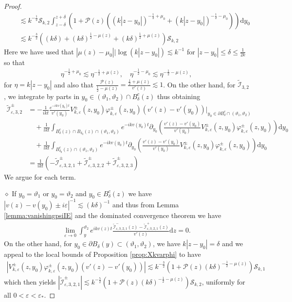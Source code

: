 \documentclass[11pt,reqno]{amsproc}
\newcommand{\diampar}[1]{\vspace{.5em}\noindent $\diamond$ \normalfont {\itshape #1.}}
\theoremstyle{definition}
\numberwithin{equation}{section}
\newcommand{\cI}{{\mathcal I}}
\newcommand{\cS}{{\mathcal S}}
\renewcommand{\d}{\mathrm{d}}
\newcommand{\ep}{\varepsilon}
\renewcommand{\P}{{\mathcal{P}}}
\begin{document}
\begin{proof}
\begin{align*}
&\quad\lesssim k^{-\frac12}\cS_{k,2}\int_{z-\delta}^{z+\delta} \left( 1  + \P(z) \left( (k|z-y_0|) ^{-\frac12+\mu_0} + (k|z-y_0|) ^{-\frac12-\mu_0} \right) \right) \d y_0 \\
&\quad\lesssim k^{-\frac32}\left( (k\delta) +  (k\delta)^{\frac12-\mu(z)} +  (k\delta)^{\frac12+\mu(z)} \right) \cS_{k,2}
\end{align*}
Here we have used that $|\mu(z) - \mu_0||\log(k|z-y_0|) \lesssim k^{-1}$ for $|z-y_0|\leq \delta \leq\frac{1}{2k}$ so that
\begin{align*}
\eta^{-\frac12+\mu_0} \lesssim \eta^{-\frac12+\mu(z)}, \quad \eta^{-\frac12-\mu_0} \lesssim \eta^{-\frac12-\mu(z)}, 
\end{align*}
for $\eta=k|z-y_0|$ and also that $\frac{\P(z)}{\frac12-\mu(z)}= \frac{\frac12+\mu(z)}{v'(z)}\lesssim 1$. On the other hand, for $\widetilde\cI_{3,2}$, we integrate by parts in $y_0\in (\vartheta_1,\vartheta_2)\cap B_\delta^c(z)$ thus obtaining
\begin{align*}
\widetilde\cI_{\ep,3,2}^\pm &= -\frac{1}{ikt}\frac{e^{-ikv(y_0)t}}{v'(y_0)} V_{k,\ep}^\pm(z,y_0) \varphi_{k,\ep}^\pm(z,y_0)(v'(z) - v'(y_0)) \Big|_{y_0\in \partial B_\delta^c\cap(\vartheta_1,\vartheta_2)} \\
&\quad + \frac{1}{ikt}\int_{B_{\delta}^c(z)\cap B_{\delta_0}(z)\cap(\vartheta_1,\vartheta_2)}e^{-ikv(y_0)t}\partial_{y_0} \left( \frac{v'(z) - v'(y_0)}{v'(y_0)}V_{k,\ep}^\pm(z,y_0) \varphi_{k,\ep}^\pm(z,y_0) \right)  \d y_0 \\
&\quad + \frac{1}{ikt}\int_{B_{\delta_0}^c(z)\cap(\vartheta_1,\vartheta_2)}e^{-ikv(y_0)t}\partial_{y_0} \left( \frac{v'(z) - v'(y_0)}{v'(y_0)}V_{k,\ep}^\pm(z,y_0) \varphi_{k,\ep}^\pm(z,y_0) \right)  \d y_0 \\
&=  \frac{1}{ikt} \left( -\widetilde\cI_{\ep,3,2,1}^\pm + \widetilde\cI_{\ep,3,2,2}^\pm + \widetilde\cI_{\ep,3,2,3}^\pm  \right)
\end{align*}
We argue for each term.

\diampar{Estimates for $\widetilde\cI_{\ep,3,2,1}^\pm$} If $y_0=\vartheta_1$ or $y_0=\vartheta_2$ and  $y_0\in B_\delta^c(z)$ we have $|v(z) - v(y_0)\pm i\ep|^{-1}\lesssim (k\delta)^{-1}$ and thus from Lemma \ref{lemma:vanishingpsiIE} and the dominated convergence theorem we have
\begin{align*}
\lim_{\ep\rightarrow 0} \int_y^{\vartheta_2} e^{ikv(z) t} \frac{\widetilde\cI_{\ep,3,2,1}^-(z) - \widetilde\cI_{\ep,3,2,1}^+(z)}{v'(z)} \d z =0.
\end{align*}
On the other hand, for $y_0\in \partial B_{\delta}(y)\subset  (\vartheta_1,\vartheta_2)$, we have $k|z-y_0|=\delta$ and we appeal to the local bounds of Proposition \ref{prop:Xkvarphi} to have
\begin{align*}
\left| V_{k,\ep}^\pm(z,y_0)\varphi_{k,\ep}^\pm(z,y_0) (v'(z) - v'(y_0)) \right| \lesssim k^{-\frac32}\left( 1 + \P(z) (k\delta)^{-\frac12-\mu(z)} \right) \cS_{k,1}
\end{align*}
which then yields $|\widetilde\cI_{\ep,3,2,1}^\pm | \lesssim k^{-\frac52}\left( 1 + \P(z) (k\delta)^{-\frac12-\mu(z)} \right) \cS_{k,2}$, uniformly for all $0< \ep< \ep_*$.


\end{proof}
\end{document}
